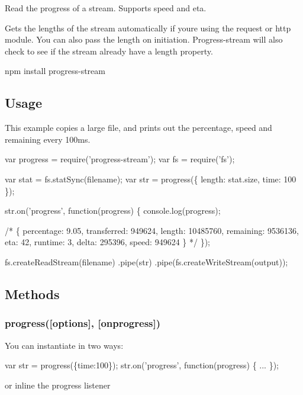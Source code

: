Read the progress of a stream. Supports speed and eta.

Gets the lengths of the stream automatically if you\textquotesingle{}re using the request or http module. You can also pass the length on initiation. Progress-\/stream will also check to see if the stream already have a length property. \begin{DoxyVerb}npm install progress-stream
\end{DoxyVerb}


\subsection*{Usage}

This example copies a large file, and prints out the percentage, speed and remaining every 100ms.


\begin{DoxyCode}
var progress = require('progress-stream');
var fs = require('fs');

var stat = fs.statSync(filename);
var str = progress(\{
    length: stat.size,
    time: 100
\});

str.on('progress', function(progress) \{
    console.log(progress);

    /*
    \{
        percentage: 9.05,
        transferred: 949624,
        length: 10485760,
        remaining: 9536136,
        eta: 42,
        runtime: 3,
        delta: 295396,
        speed: 949624
    \}
    */
\});

fs.createReadStream(filename)
    .pipe(str)
    .pipe(fs.createWriteStream(output));
\end{DoxyCode}


\subsection*{Methods}

\subsubsection*{progress(\mbox{[}options\mbox{]}, \mbox{[}onprogress\mbox{]})}

You can instantiate in two ways\+:


\begin{DoxyCode}
var str = progress(\{time:100\});
str.on('progress', function(progress) \{ ... \});
\end{DoxyCode}


or inline the progress listener


